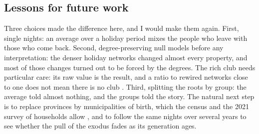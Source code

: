 \subsection{Lessons for future work}

Three choices made the difference here, and I would make them again. First, single nights: an average over a holiday period mixes the people who leave with those who come back. Second, degree-preserving null models before any interpretation: the denser holiday networks changed almost every property, and most of those changes turned out to be forced by the degrees. The rich club needs particular care: its raw value is the result, and a ratio to rewired networks close to one does not mean there is no club \citep{zhou2007structural}. Third, splitting the roots by group: the average told almost nothing, and the groups told the story. The natural next step is to replace provinces by municipalities of birth, which the census and the 2021 survey of households allow \citep{ine2023ecepov}, and to follow the same nights over several years to see whether the pull of the exodus fades as its generation ages.

